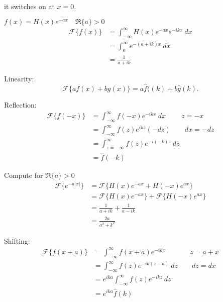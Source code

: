 \documentclass[cm]{article}
\renewcommand{\F}{\mathscr F}
\newcommand{\fhat}{\hat{f}}
\renewcommand{\infint}{\int_{-\infty}^{\infty}}
\newcommand{\ghat}{\hat{g}}
\begin{document}
                  it switches on at $x = 0$.
            \item $f(x) = H(x)e^{-ax} \quad \Re\{a\} > 0$
            \begin{align*}
                \F\{f(x)\} &= \infint H(x) e^{-ax} e^{-ikx}~dx \\
                    &= \int_0^{\infty} e^{-(a+ik)x}~dx \\
                    &= \frac{1}{a+ik}
            \end{align*}
        \xenum
        \item Linearity:
        $$\F\{af(x) + bg(x)\} = a\fhat((k) + b\ghat(k).$$
        \item Reflection:
            \begin{align*}
            \F\{f(-x)\} &= \infint f(-x) e^{-ikx}~dx \qquad ~z = -x \\
            &= \infint f(z) e^{ikz}(-dz) \qquad dx = - dz\\
            &= \int_{z=-\infty}^{\infty} f(z) e^{-i(-k)z}~dz \\
            &= \fhat(-k)
            \end{align*}
        \item Compute for $\Re\{a\} > 0$
        \begin{align*}
        \F\{e^{-a|x|}\} &= \F\{H(x)e^{-ax} + H(-x)e^{ax}\} \\
        &= \F\{H(x) e^{-ax}\} + \F\{H(-x) e^{ax}\} \\
        &= \frac{1}{a+ik} + \frac{1}{a-ik} \\
        &= \frac{2a}{a^2 + k^2}
        \end{align*}
        \item Shifting:
        \begin{align*}
        \F\{f(x+a)\} &= \infint f(x+a) e^{-ikx}  \quad \qquad ~~z = a+x \\
        &= \infint f(z) e^{-ik(z-a)}~dz \qquad dz = dx \\
        &= e^{ika} \infint f(z) e^{-ikz}~dz \\
        &= e^{ika} \fhat(k)
        \end{align*}
\xenum
\end{document}
